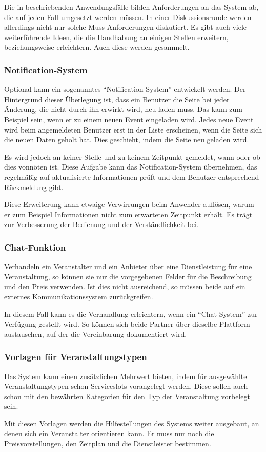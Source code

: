 

Die in  beschriebenden Anwendungsfälle bilden Anforderungen an das System ab, die auf jeden Fall umgesetzt werden müssen. In einer Diskussionsrunde werden allerdings nicht nur solche Muss-Anforderungen diskutiert. Es gibt auch viele weiterführende Ideen, die die Handhabung an einigen Stellen erweitern, beziehungsweise erleichtern. Auch diese werden gesammelt.

\subsubsection{Notification-System}

Optional kann ein sogenanntes \enquote{Notification-System} entwickelt werden. Der Hintergrund dieser Überlegung ist, dass ein Benutzer die Seite bei jeder Änderung, die nicht durch ihn erwirkt wird, neu laden muss. Das kann zum Beispiel sein, wenn er zu einem neuen Event eingeladen wird. Jedes neue Event wird beim angemeldeten Benutzer erst in der Liste erscheinen, wenn die Seite sich die neuen Daten geholt hat. Dies geschieht, indem die Seite neu geladen wird.

Es wird jedoch an keiner Stelle und zu keinem Zeitpunkt gemeldet, wann oder ob dies vonnöten ist. Diese Aufgabe kann das Notification-System übernehmen, das regelmäßig auf aktualisierte Informationen prüft und dem Benutzer entsprechend Rückmeldung gibt.

Diese Erweiterung kann etwaige Verwirrungen beim Anwender auflösen, warum er zum Beispiel Informationen nicht zum erwarteten Zeitpunkt erhält. Es trägt zur Verbesserung der Bedienung und der Verständlichkeit bei.

\subsubsection{Chat-Funktion}

Verhandeln ein Veranstalter und ein Anbieter über eine Dienstleistung für eine Veranstaltung, so können sie nur die vorgegebenen Felder für die Beschreibung und den Preis verwenden. Ist dies nicht ausreichend, so müssen beide auf ein externes Kommunikationssystem zurückgreifen.

In diesem Fall kann es die Verhandlung erleichtern, wenn ein \enquote{Chat-System} zur Verfügung gestellt wird. So können sich beide Partner über dieselbe Plattform austauschen, auf der die Vereinbarung dokumentiert wird.

\subsubsection{Vorlagen für Veranstaltungstypen}
Das System kann einen zusätzlichen Mehrwert bieten, indem für ausgewählte Veranstaltungstypen schon Serviceslots vorangelegt werden. Diese sollen auch schon mit den bewährten Kategorien für den Typ der Veranstaltung vorbelegt sein.

Mit diesen Vorlagen werden die Hilfestellungen des Systems weiter ausgebaut, an denen sich ein Veranstalter orientieren kann. Er muss nur noch die Preisvorstellungen, den Zeitplan und die Dienstleister bestimmen.
